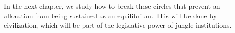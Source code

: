 In the next chapter, we study how to break these circles that prevent an allocation from being sustained as an equilibrium. This will be done by civilization, which will be part of the legislative power of jungle institutions.



















